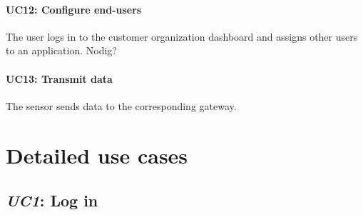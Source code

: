 \documentclass[english]{sareport}
\begin{document}
\paragraph{UC12: Configure end-users}
The user logs in to the customer organization dashboard and assigns other users to an application.
Nodig?

\paragraph{UC13: Transmit data}
The sensor sends data to the corresponding gateway. 


\section{Detailed use cases}
\subsection{\emph{UC1}: Log in}
\end{document}
